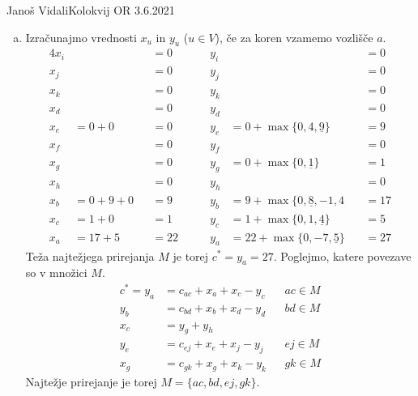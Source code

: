\begin{naloga}{Janoš Vidali}{Kolokvij OR 3.6.2021}
\begin{odgovor}
\begin{enumerate}[(a)]
\item Izračunajmo vrednosti $x_u$ in $y_u$ ($u \in V$),
če za koren vzamemo vozlišče $a$.
\begin{alignat*}{4}
x_i &&&= 0 &\qquad y_i &&&= 0 \\
x_j &&&= 0 &\qquad y_j &&&= 0 \\
x_k &&&= 0 &\qquad y_k &&&= 0 \\
x_d &&&= 0 &\qquad y_d &&&= 0 \\
x_e &= 0+0 &&= 0 &\qquad
y_e &= 0 + \max\{0, 4, \underline{9}\} &&= 9 \\
x_f &&&= 0 &\qquad y_f &&&= 0 \\
x_g &&&= 0 &\qquad
y_g &= 0 + \max\{0, \underline{1}\} &&= 1 \\
x_h &&&= 0 &\qquad y_h &&&= 0 \\
x_b &= 0+9+0 &&= 9 &\qquad
y_b &= 9 + \max\{0, \underline{8}, -1, 4\ &&= 17 \\
x_c &= 1+0 &&= 1 &\qquad
y_c &= 1 + \max\{0, 1, \underline{4}\} &&= 5 \\
x_a &= 17+5 &&= 22 &\qquad
y_a &= 22 + \max\{0, -7, \underline{5}\} &&= 27
\end{alignat*}
Teža najtežjega prirejanja $M$ je torej $c^* = y_a = 27$.
Poglejmo, katere povezave so v množici $M$.
\begin{align*}
c^* = y_a &= c_{ac} + x_a + x_c - y_c && ac \in M \\
y_b &= c_{bd} + x_b + x_d - y_d && bd \in M \\
x_c &= y_g + y_h \\
y_e &= c_{ej} + x_e + x_j - y_j && ej \in M \\
x_g &= c_{gk} + x_g + x_k - y_k && gk \in M
\end{align*}
Najtežje prirejanje je torej $M = \{ac, bd, ej, gk\}$.
\end{enumerate}
\end{odgovor}
\end{naloga}
